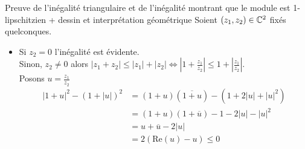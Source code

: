 \documentclass{article}
\renewenvironment{question_kholle}[2][ ]
{
	\subsection{\texorpdfstring{#2}{}}
	\notblank{#1}
	{
		\noindent #1
		\bigbreak
	}
	{}
	\begin{proof}
}
{
	\end{proof}
}
\begin{document}
\allowdisplaybreaks[4]
\begin{question_kholle}
  {Preuve de l'inégalité triangulaire et de l'inégalité montrant que le module est 1-lipschitzien + dessin et interprétation géométrique}
  Soient $(z_1,z_2) \in \mathbb C^2$ fixés quelconques.
  \begin{itemize}[label=$\lozenge$]
    \item

          Si $z_{2} = 0$ l'inégalité est évidente.\\
          Sinon, $z_{2} \neq 0$ alors $\lvert z_{1}+z_{2} \rvert \leqslant \lvert z_{1} \rvert + \lvert z_{2} \rvert \iff \left| 1+\frac{z_{1}}{z_{2}} \right|\leqslant 1 + \left\lvert  \frac{z_{1}}{z_{2}}  \right\rvert$.\\
          Posons $u = \frac{z_{1}}{z_{2}}$
          \begin{align*}
            \lvert 1+u \rvert ^{2} - (1+\lvert u \rvert )^{2} & = (1+u)(\overline{1+u})-(1+2\lvert u \rvert +\lvert u \rvert ^{2})     \\
                                                              & = (1+u)(1+ \overline u) - 1 - 2\lvert u \rvert  - \lvert u \rvert ^{2} \\
                                                              & = u + \overline u -2 \lvert u \rvert                                   \\
                                                              & = 2(\mathrm{Re}(u)-u) \leqslant 0
          \end{align*}


\end{itemize}
\end{question_kholle}
\end{document}
